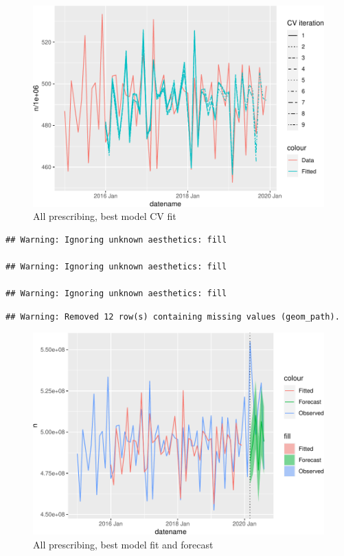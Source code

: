 \documentclass[
  english,
  man,floatsintext]{apa7}
\begin{document}
\begin{figure}
\centering
\includegraphics{paper_files/figure-latex/all-prescribing-cv-plot-1.pdf}
\caption{\label{fig:all-prescribing-cv-plot}All prescribing, best model CV fit}
\end{figure}

\begin{verbatim}
## Warning: Ignoring unknown aesthetics: fill

## Warning: Ignoring unknown aesthetics: fill

## Warning: Ignoring unknown aesthetics: fill
\end{verbatim}

\begin{verbatim}
## Warning: Removed 12 row(s) containing missing values (geom_path).
\end{verbatim}

\begin{figure}
\centering
\includegraphics{paper_files/figure-latex/all-prescribing-forecast-plot-1.pdf}
\caption{\label{fig:all-prescribing-forecast-plot}All prescribing, best model fit and forecast}
\end{figure}
\end{document}
